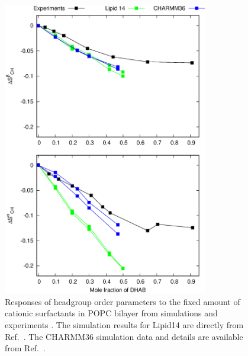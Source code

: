 \documentclass[journal=jpcbfk]{achemso}
\begin{document}
\begin{figure}[]
  \centering
  \includegraphics[width=9.0cm]{../Figs/HGopsDHMDMAB.eps}
  \caption{\label{CHANGESwithDHMDMAB}
  Responses of headgroup order parameters to the fixed amount of cationic surfactants in
  POPC bilayer from simulations and experiments \cite{scherer89}.
  The simulation results for Lipid14 are directly from Ref.~.
  The CHARMM36 simulation data and details are available from Ref.~.
}
\end{figure}

\pagebreak
\end{document}
